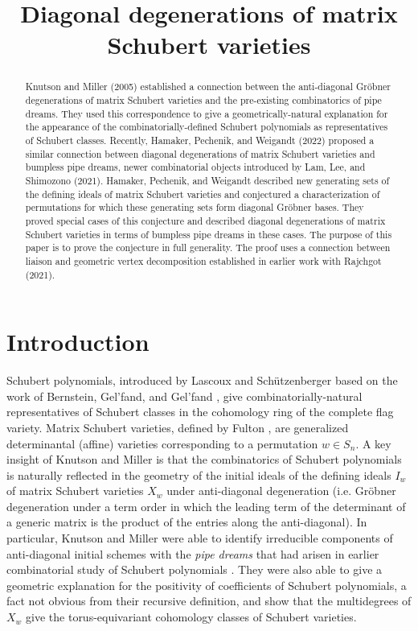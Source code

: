 \documentclass[ALCO,Unicode,published]{cedram}
\title{Diagonal degenerations of matrix Schubert varieties}
\author[\initial{P.} Klein]{\firstname{Patricia}  \lastname{Klein}}
\begin{document}
\begin{abstract}
Knutson and Miller (2005) established a connection between the anti-diagonal Gr\"obner degenerations of matrix Schubert varieties and the pre-existing combinatorics of pipe dreams.  They used this correspondence to give a geometrically-natural explanation for the appearance of the combinatorially-defined Schubert polynomials as representatives of Schubert classes.  Recently, Hamaker, Pechenik, and Weigandt (2022) proposed a similar connection between diagonal degenerations of matrix Schubert varieties and bumpless pipe dreams, newer combinatorial objects introduced by Lam, Lee, and Shimozono (2021).  Hamaker, Pechenik, and Weigandt described new generating sets of the defining ideals of matrix Schubert varieties and conjectured a characterization of permutations for which these generating sets form diagonal Gr\"obner bases.  They proved special cases of this conjecture and described diagonal degenerations of matrix Schubert varieties in terms of bumpless pipe dreams in these cases.  The purpose of this paper is to prove the conjecture in full generality.  The proof uses a connection between liaison and geometric vertex decomposition established in earlier work with Rajchgot (2021).
\end{abstract}


\maketitle

\section{Introduction}

Schubert polynomials, introduced by Lascoux and Sch\"utzenberger \cite{LS82} based on the work of Bernstein, Gel'fand, and Gel'fand \cite{BGG73}, give combinatorially-natural representatives of Schubert classes in the cohomology ring of the complete flag variety.  Matrix Schubert varieties, defined by Fulton \cite{Ful92}, are generalized determinantal (affine) varieties corresponding to a permutation $w \in S_n$.  A key insight of Knutson and Miller \cite{KM05} is that the combinatorics of Schubert polynomials is naturally reflected in the geometry of the initial ideals of the defining ideals $I_w$ of matrix Schubert varieties $X_w$ under anti-diagonal degeneration (i.e. Gr\"obner degeneration under a term order in which the leading term of the determinant of a generic matrix is the product of the entries along the anti-diagonal).  In particular, Knutson and Miller were able to identify irreducible components of anti-diagonal initial schemes with the \emph{pipe dreams} that had arisen in earlier combinatorial study of Schubert polynomials \cite{BB93, FK94}.  They were also able to give a geometric explanation for the positivity of coefficients of Schubert polynomials, a fact not obvious from their recursive definition, and show that the multidegrees of $X_w$ give the torus-equivariant cohomology classes of Schubert varieties.
\end{document}
